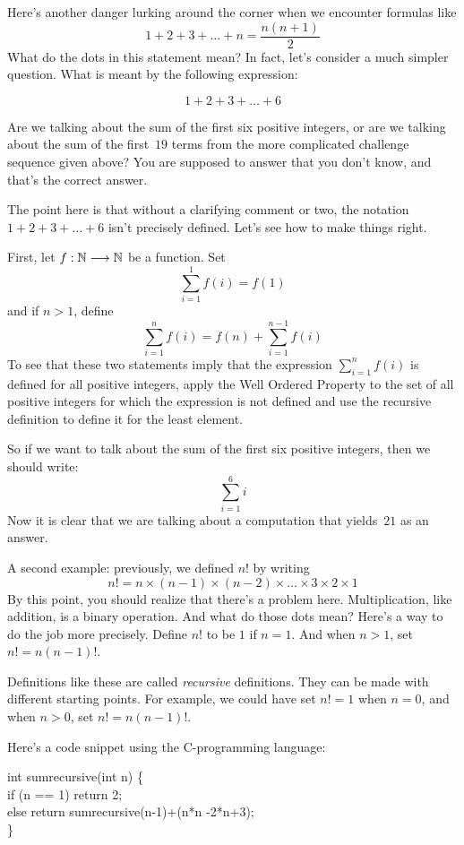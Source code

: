 Here's another danger lurking around the corner when we encounter
formulas like
\[
1+2+3+\dots+n = \frac{n(n+1)}{2}
\]
What do the dots in this statement mean?  In fact, let's consider a
much simpler question.  What is meant by the following
expression:

\begin{equation*}
1+2+3+\dots+6
\end{equation*}

Are we talking about the sum of the first six
positive integers, or are we talking about the sum of the first~$19$
terms from the more complicated challenge sequence given above?
You are supposed to answer that you don't know, and that's the
correct answer.

The point here is that without a clarifying comment or two, the
notation $1+2+3+\dots+6$ isn't precisely defined.
Let's see how to make things right.

First, let $f:\mathbb{N}\longrightarrow\mathbb{N}$ be
a function.  Set
\[
\sum_{i=1}^1 f(i) = f(1)
\]
and if $n>1$, define
\[
\sum_{i=1}^n f(i) = f(n)+\sum_{i=1}^{n-1}f(i)
\]
To see that these two statements imply that the expression
$\sum_{i=1}^nf(i)$ is defined for all positive integers, apply the
Well Ordered Property to the set of all positive integers for which
the expression is not defined and use the recursive definition to
define it for the least element.

So if we want to talk about the sum of the first six positive
integers, then we should write:
\[
\sum_{i=1}^6 i
\]
Now it is clear that we are talking about a computation that
yields~$21$ as an answer.

A second example:
previously, we defined $n!$ by
writing
\[
n! = n\times (n-1)\times (n-2)\times\dots\times3\times2\times 1
\]
By this point, you should realize that there's a problem here.
Multiplication, like addition, is a binary operation.  And what do
those dots mean?  Here's a way to do the job more precisely.  Define
$n!$ to be $1$ if $n=1$.  And when $n>1$, set $n! = n(n-1)!$.

Definitions like these are called \textit{recursive}
definitions.  They can be made with different
starting points.  For example, we could have set
$n!=1$ when $n=0$, and when $n>0$, set $n!=n(n-1)!$.

Here's a code snippet using the C-programming language:

\medskip
\begin{tt}
\noindent
int sumrecursive(int n) \{\\
\hspace{.25in}\mbox{} if (n == 1) return 2;\\
\hspace{.25in}\mbox{} else return sumrecursive(n-1)+(n*n -2*n+3);\\
\}\\
\end{tt}

